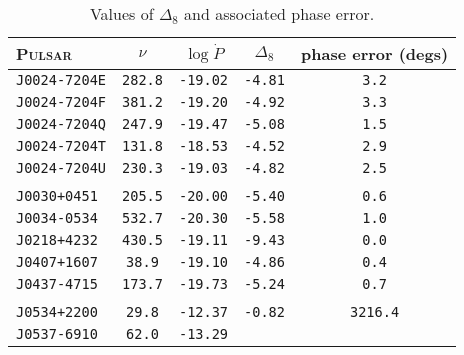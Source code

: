 \begin{longtable}{ l | c | c | c | c }\caption{\label{delta8table} Values of $\Delta_8$ and
associated phase error.} \\
\hline \hline
\footnotesize{P\textsc{ulsar}} & \footnotesize{$\nu$} & \footnotesize{$\log{\dot{P}}$} &
\footnotesize{$\Delta_8$} & \footnotesize{phase error (degs)} \\
\hline
\scriptsize{\tt{J0024-7204E}} & \scriptsize{\tt{282.8}} & \scriptsize{\tt{-19.02}} &
\scriptsize{\tt{-4.81}} & \scriptsize{\tt{3.2}} \\[-16pt]
\scriptsize{\tt{J0024-7204F}} & \scriptsize{\tt{381.2}} & \scriptsize{\tt{-19.20}} &
\scriptsize{\tt{-4.92}} & \scriptsize{\tt{3.3}} \\[-16pt]
\scriptsize{\tt{J0024-7204Q}} & \scriptsize{\tt{247.9}} & \scriptsize{\tt{-19.47}} &
\scriptsize{\tt{-5.08}} & \scriptsize{\tt{1.5}} \\[-16pt]
\scriptsize{\tt{J0024-7204T}} & \scriptsize{\tt{131.8}} & \scriptsize{\tt{-18.53}} &
\scriptsize{\tt{-4.52}} & \scriptsize{\tt{2.9}} \\[-16pt]
\scriptsize{\tt{J0024-7204U}} & \scriptsize{\tt{230.3}} & \scriptsize{\tt{-19.03}} &
\scriptsize{\tt{-4.82}} & \scriptsize{\tt{2.5}} \\[-16pt]
\\[-20pt]
\scriptsize{\tt{J0030+0451}} & \scriptsize{\tt{205.5}} & \scriptsize{\tt{-20.00}} &
\scriptsize{\tt{-5.40}} & \scriptsize{\tt{0.6}} \\[-16pt]
\scriptsize{\tt{J0034-0534}} & \scriptsize{\tt{532.7}} & \scriptsize{\tt{-20.30}} &
\scriptsize{\tt{-5.58}} & \scriptsize{\tt{1.0}} \\[-16pt]
\scriptsize{\tt{J0218+4232}} & \scriptsize{\tt{430.5}} & \scriptsize{\tt{-19.11}} &
\scriptsize{\tt{-9.43}} & \scriptsize{\tt{0.0}} \\[-16pt]
\scriptsize{\tt{J0407+1607}} & \scriptsize{\tt{38.9}} & \scriptsize{\tt{-19.10}} &
\scriptsize{\tt{-4.86}} & \scriptsize{\tt{0.4}} \\[-16pt]
\scriptsize{\tt{J0437-4715}} & \scriptsize{\tt{173.7}} & \scriptsize{\tt{-19.73}} &
\scriptsize{\tt{-5.24}} & \scriptsize{\tt{0.7}} \\[-16pt]
\\[-20pt] 
\scriptsize{\tt{J0534+2200}} & \scriptsize{\tt{29.8}} & \scriptsize{\tt{-12.37}} &
\scriptsize{\tt{-0.82}} & \scriptsize{\tt{3216.4}} \\[-16pt]
\scriptsize{\tt{J0537-6910}} & \scriptsize{\tt{62.0}} & \scriptsize{\tt{-13.29}} &

\end{longtable}

